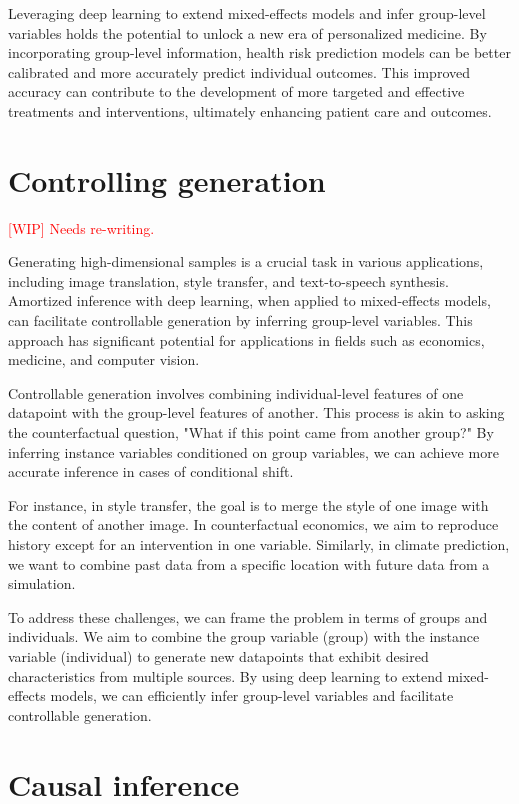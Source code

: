 \documentclass[backrefs]{cam-thesis}
\newcommand{\crit}[1]{\textcolor{red}{#1}}
\begin{document}
Leveraging deep learning to extend mixed-effects models and infer group-level variables holds the potential to unlock a new era of personalized medicine. By incorporating group-level information, health risk prediction models can be better calibrated and more accurately predict individual outcomes. This improved accuracy can contribute to the development of more targeted and effective treatments and interventions, ultimately enhancing patient care and outcomes.

\chapter{Controlling generation}

\crit{[WIP] Needs re-writing.}


Generating high-dimensional samples is a crucial task in various applications, including image translation, style transfer, and text-to-speech synthesis. Amortized inference with deep learning, when applied to mixed-effects models, can facilitate controllable generation by inferring group-level variables. This approach has significant potential for applications in fields such as economics, medicine, and computer vision.

Controllable generation involves combining individual-level features of one datapoint with the group-level features of another. This process is akin to asking the counterfactual question, "What if this point came from another group?" By inferring instance variables conditioned on group variables, we can achieve more accurate inference in cases of conditional shift.

For instance, in style transfer, the goal is to merge the style of one image with the content of another image. In counterfactual economics, we aim to reproduce history except for an intervention in one variable. Similarly, in climate prediction, we want to combine past data from a specific location with future data from a simulation.

To address these challenges, we can frame the problem in terms of groups and individuals. We aim to combine the group variable (group) with the instance variable (individual) to generate new datapoints that exhibit desired characteristics from multiple sources. By using deep learning to extend mixed-effects models, we can efficiently infer group-level variables and facilitate controllable generation.

\chapter{Causal inference}
\end{document}
